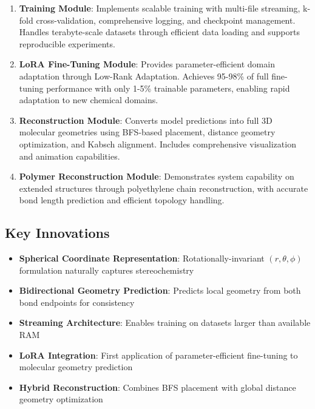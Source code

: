 \documentclass[11pt,a4paper]{article}
\begin{document}
\begin{enumerate}
    \item \textbf{Training Module}: Implements scalable training with multi-file streaming, k-fold cross-validation, comprehensive logging, and checkpoint management. Handles terabyte-scale datasets through efficient data loading and supports reproducible experiments.

    \item \textbf{LoRA Fine-Tuning Module}: Provides parameter-efficient domain adaptation through Low-Rank Adaptation. Achieves 95-98\% of full fine-tuning performance with only 1-5\% trainable parameters, enabling rapid adaptation to new chemical domains.

    \item \textbf{Reconstruction Module}: Converts model predictions into full 3D molecular geometries using BFS-based placement, distance geometry optimization, and Kabsch alignment. Includes comprehensive visualization and animation capabilities.

    \item \textbf{Polymer Reconstruction Module}: Demonstrates system capability on extended structures through polyethylene chain reconstruction, with accurate bond length prediction and efficient topology handling.
\end{enumerate}

\subsection{Key Innovations}

\begin{itemize}
    \item \textbf{Spherical Coordinate Representation}: Rotationally-invariant $(r, \theta, \phi)$ formulation naturally captures stereochemistry
    \item \textbf{Bidirectional Geometry Prediction}: Predicts local geometry from both bond endpoints for consistency
    \item \textbf{Streaming Architecture}: Enables training on datasets larger than available RAM
    \item \textbf{LoRA Integration}: First application of parameter-efficient fine-tuning to molecular geometry prediction
    \item \textbf{Hybrid Reconstruction}: Combines BFS placement with global distance geometry optimization
\end{itemize}
\end{document}
